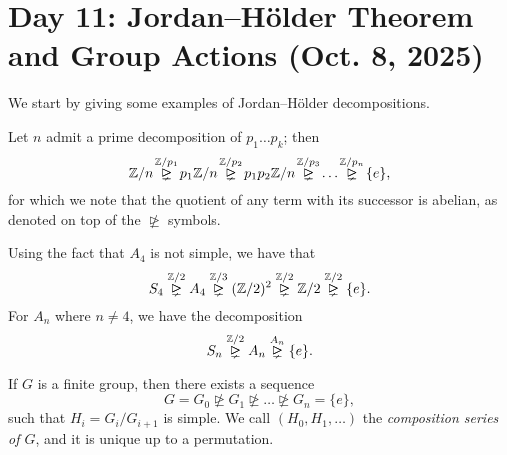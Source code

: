 \section{Day 11: Jordan--H\"older Theorem and Group Actions (Oct. 8, 2025)}
We start by giving some examples of Jordan--H\"older decompositions.
\begin{example}
    Let $n$ admit a prime decomposition of $p_1 \dots p_k$; then
    \[ \ZZ/n \! \stackrel{\ZZ/p_1}{\nunrhd} \! p_1\ZZ/n \! \stackrel{\ZZ/p_2}{\nunrhd} \! p_1p_2\ZZ/n \! \stackrel{\ZZ/p_3}{\nunrhd} \! \dots \! \stackrel{\ZZ/p_n}{\nunrhd} \! \{e\}, \]
    for which we note that the quotient of any term with its successor is abelian, as denoted on top of the $\nunrhd$ symbols.
\end{example}
\begin{example}
    Using the fact that $A_4$ is not simple, we have that
    \[ S_4 \stackrel{\ZZ/2}{\nunrhd} A_4 \stackrel{\ZZ/3}{\nunrhd} (\ZZ/2)^2 \stackrel{\ZZ/2}{\nunrhd} \ZZ/2 \stackrel{\ZZ/2}{\nunrhd} \{e\}. \]
    For $A_n$ where $n \neq 4$, we have the decomposition
    \[ S_n \stackrel{\ZZ/2}{\nunrhd} A_n \stackrel{A_n}{\nunrhd} \{e\}. \]
\end{example}
\begin{theorem}
    If $G$ is a finite group, then there exists a sequence
    \[ G = G_0 \nunrhd G_1 \nunrhd \dots \nunrhd G_n = \{e\}, \]
    such that $H_i = G_i/G_{i+1}$ is simple. We call $(H_0, H_1, \dots)$ the \textit{composition series of $G$}, and it is unique up to a permutation.
\end{theorem}
